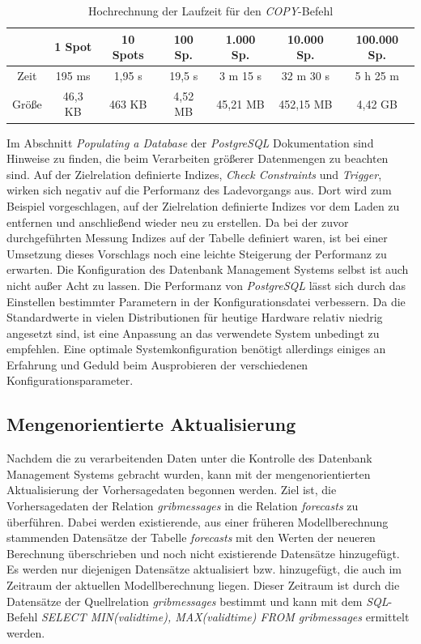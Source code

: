 \begin{table}[h]
  \centering
  {\sf
    \footnotesize
    \begin{longtable}{c|c|c|c|c|c|c}

      \toprule
      \textbf & \textbf{1 Spot} & \textbf{10 Spots} & \textbf{100 Sp.} & \textbf{1.000 Sp.} & \textbf{10.000 Sp.} & \textbf{100.000 Sp.} \\
      \midrule
      Zeit & 195 ms & 1,95 s & 19,5 s & 3 m 15 s & 32 m 30 s & 5 h 25 m \\
      Größe & 46,3 KB & 463 KB & 4,52 MB & 45,21 MB & 452,15 MB & 4,42 GB \\
      \bottomrule
    \end{longtable}
  }
  \caption{Hochrechnung der Laufzeit für den \textit{COPY}-Befehl}
  \label{tab:transformation_bulk_load}
\end{table}

Im Abschnitt \textit{Populating a Database} \cite{postgresql:populate}
der \textit{PostgreSQL} Dokumentation sind Hinweise zu finden, die
beim Verarbeiten größerer Datenmengen zu beachten sind. Auf der
Zielrelation definierte Indizes, \textit{Check Constraints} und
\textit{Trigger}, wirken sich negativ auf die Performanz des
Ladevorgangs aus. Dort wird zum Beispiel vorgeschlagen, auf der
Zielrelation definierte Indizes vor dem Laden zu entfernen und
anschließend wieder neu zu erstellen. Da bei der zuvor durchgeführten
Messung Indizes auf der Tabelle definiert waren, ist bei einer
Umsetzung dieses Vorschlags noch eine leichte Steigerung der
Performanz zu erwarten. Die Konfiguration des Datenbank Management
Systems selbst ist auch nicht außer Acht zu lassen. Die Performanz von
\textit{PostgreSQL} lässt sich durch das Einstellen bestimmter
Parametern in der Konfigurationsdatei verbessern. Da die Standardwerte
in vielen Distributionen für heutige Hardware relativ niedrig
angesetzt sind, ist eine Anpassung an das verwendete System unbedingt
zu empfehlen. Eine optimale Systemkonfiguration benötigt allerdings
einiges an Erfahrung und Geduld beim Ausprobieren der verschiedenen
Konfigurationsparameter.

\subsection{Mengenorientierte Aktualisierung}
Nachdem die zu verarbeitenden Daten unter die Kontrolle des Datenbank
Management Systems gebracht wurden, kann mit der mengenorientierten
Aktualisierung der Vorhersagedaten begonnen werden. Ziel ist, die
Vorhersagedaten der Relation \textit{grib\textunderscore messages} in
die Relation \textit{forecasts} zu überführen. Dabei werden
existierende, aus einer früheren Modellberechnung stammenden
Datensätze der Tabelle \textit{forecasts} mit den Werten der neueren
Berechnung überschrieben und noch nicht existierende Datensätze
hinzugefügt. Es werden nur diejenigen Datensätze aktualisiert bzw.
hinzugefügt, die auch im Zeitraum der aktuellen Modellberechnung
liegen. Dieser Zeitraum ist durch die Datensätze der Quellrelation
\textit{grib\textunderscore messages} bestimmt und kann mit dem
\textit{SQL}-Befehl \textit{SELECT MIN(valid\textunderscore time),
  MAX(valid\textunderscore time) FROM grib\textunderscore messages}
ermittelt werden.

